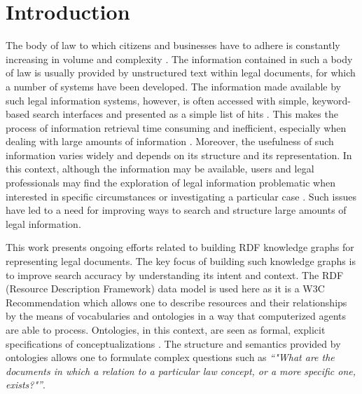 \documentclass[runningheads]{llncs}
\begin{document}
\section{Introduction}\label{sec:introduction}

The body of law to which citizens and businesses have to adhere is constantly increasing in volume and complexity \cite{Boella2016}. The information contained in such a body of law is usually provided by  unstructured text within legal documents, for which a number of systems have been developed. The information made available by such legal information systems, however, is often accessed with simple, keyword-based search interfaces and presented as a simple list of hits \cite{Filtz2017}. This makes the process of information retrieval time consuming and inefficient, especially when dealing with large amounts of information \cite{Schweighofer2010}. Moreover, the usefulness of such information varies widely and depends on its structure and its representation. In this context, although the information may be available, users and legal professionals may find the exploration of legal information problematic when interested in specific circumstances or investigating a particular case \cite{Schweighofer2010}. Such issues have led to a need for improving ways to search and structure large amounts of legal information. 

This work presents ongoing efforts related to building RDF knowledge graphs for representing legal documents. The key focus of building such knowledge graphs is to improve search accuracy by understanding its intent and context. The RDF (Resource Description Framework) \cite{cyganiak2014rdf} data model is used here as it is a W3C Recommendation which allows one to describe resources and their relationships by the means of vocabularies and ontologies in a way that computerized agents are able to process. Ontologies, in this context, are seen as formal, explicit specifications of conceptualizations \cite{gruber1995toward}. The structure and semantics provided by ontologies allows one to formulate complex questions such as \textit{“"What are the documents in which a relation to a particular law concept, or a more specific one, exists?"”}.

\end{document}
